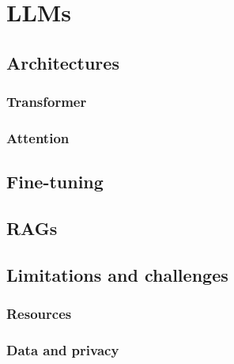 \documentclass[12pt,a4paper,openright,twoside]{book}
\begin{document}

\chapter{\Aclp{LLM}}\label{ch:llm}

\section{Architectures}\label{sec:llm-architectures}

\subsection{Transformer}\label{subsec:transformer}

\subsection{Attention}\label{subsec:attention}

\section{Fine-tuning}\label{sec:llm-fine-tuning}

\section{\Acp{RAG}}\label{sec:rag}

\section{Limitations and challenges}\label{sec:limitations-and-challenges}

\subsection{Resources}\label{subsec:resources}

\subsection{Data and privacy}\label{subsec:data-and-privacy}

\end{document}
